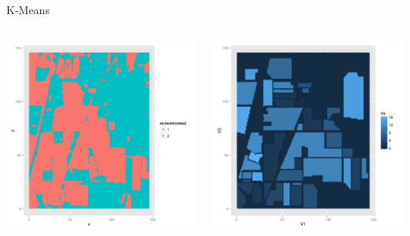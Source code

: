 \documentclass[11pt]{beamer}
\begin{document}
\begin{frame}{K-Means}
\begin{columns}[T]
\begin{column}{.48\textwidth}
\includegraphics[scale=.3]{km2.png}
\end{column}
\hfill
\begin{column}{.48\textwidth}
\includegraphics[scale=.3]{gt.png}
\end{column}
\end{columns}
\end{frame}
\end{document}
